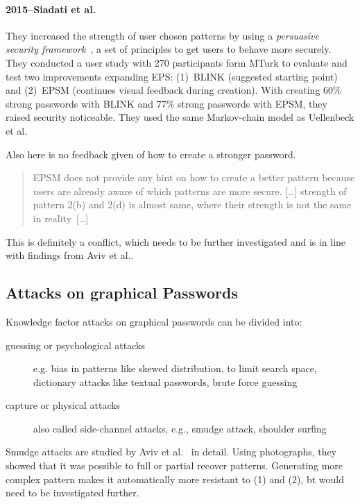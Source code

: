 \documentclass[twocolumn, a4paper, 10pt]{article}
\begin{document}
\paragraph{2015--Siadati et al.~\cite{siadati2015fortifying}}
They increased the strength of user chosen patterns by using a \textit{persuasive security framework}~\cite{forget2007persuasion, forget2008persuasion}, a set of principles to get users to behave more securely. They conducted a user study with 270 participants form MTurk to evaluate and test
two improvements expanding EPS: (1)~BLINK (suggested starting point) and (2)~EPSM (continues visual feedback during creation). With creating 60\% strong passwords with BLINK and 77\% strong passwords with EPSM, they raised security noticeable. They used the same Markov-chain model as Uellenbeck et al.~\cite{Uellenbeck:2013:QSG:2508859.2516700}

Also here is no feedback given of how to create a stronger password.

\begin{quote}
	\small
	EPSM does not provide any hint on how to create a better pattern because users are already aware of which patterns are more secure. [\dots] strength of pattern 2(b) and 2(d) is almost same, where their strength is not the same in reality~[\dots]
\end{quote}

This is definitely a conflict, which needs to be further investigated and is in line with findings from Aviv et al.\cite{Aviv:2014:UVP:2664243.2664253}.


\subsection{Attacks on graphical Passwords}
\label{sec:related:attacks}

Knowledge factor attacks on graphical passwords can be divided into:

\begin{description}
	\item[guessing or psychological attacks] e.g. bias in patterns like skewed distribution, to limit search space, dictionary attacks like textual passwords, brute force guessing
	\item[capture or physical attacks] also called side-channel attacks, e.g., smudge attack, shoulder surfing
\end{description}

Smudge attacks are studied by Aviv et al.~\cite{Aviv:2010:SAS:1925004.1925009} in detail. Using photographs, they showed that it was possible to full or partial recover patterns. Generating more complex pattern makes it automatically more resistant to (1) and (2), bt would need to be investigated further. 
\end{document}
